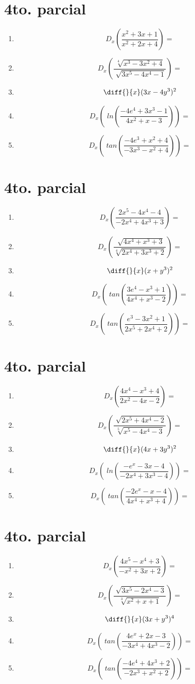 \documentclass[oneside,spanish,letter]{article}
\begin{document}
\section{4to. parcial}
\begin{enumerate}
 \item $$ D_x \left( \frac{x^2+3x+1}{x^2+2x+4}\right)=$$
 \item $$ D_x \left( \frac{\sqrt[4]{x^3-3x^2+4}}{\sqrt[]{3x^5-4x^4-1}}\right)=$$
\item $$\diff{}{x}(3x-4y^3)^2$$
 \item $$ D_x \left(\;ln\left( \frac{-4e^4+3x^3-1}{4x^2+x-3}\right)\right)=$$
 \item $$ D_x \left(\;tan\left( \frac{-4e^3+x^2+4}{-3x^3-x^2+4}\right)\right)=$$
 \end{enumerate}
  \newpage
\section{4to. parcial}
\begin{enumerate}
 \item $$ D_x \left( \frac{2x^5-4x^4-4}{-2x^4+4x^3+3}\right)=$$
 \item $$ D_x \left( \frac{\sqrt[]{4x^4+x^3+3}}{\sqrt[4]{2x^4+3x^3+2}}\right)=$$
\item $$\diff{}{x}(x+y^3)^2$$
 \item $$ D_x \left(\;tan\left( \frac{3e^4-x^3+1}{4x^4+x^3-2}\right)\right)=$$
 \item $$ D_x \left(\;tan\left( \frac{e^3-3x^2+1}{2x^5+2x^4+2}\right)\right)=$$
 \end{enumerate}
  \newpage
\section{4to. parcial}
\begin{enumerate}
 \item $$ D_x \left( \frac{4x^4-x^3+4}{2x^2-4x-2}\right)=$$
 \item $$ D_x \left( \frac{\sqrt[]{2x^5+4x^4-2}}{\sqrt[5]{x^5-4x^4-3}}\right)=$$
\item $$\diff{}{x}(4x+3y^3)^2$$
 \item $$ D_x \left(\;ln\left( \frac{-e^x-3x-4}{-2x^4+3x^3-4}\right)\right)=$$
 \item $$ D_x \left(\;tan\left( \frac{-2e^x-x-4}{4x^4+x^3+4}\right)\right)=$$
 \end{enumerate}
  \newpage
\section{4to. parcial}
\begin{enumerate}
 \item $$ D_x \left( \frac{4x^5-x^4+3}{-x^2+3x+2}\right)=$$
 \item $$ D_x \left( \frac{\sqrt[]{3x^5-2x^4-3}}{\sqrt[3]{x^2+x+1}}\right)=$$
\item $$\diff{}{x}(3x+y^3)^4$$
 \item $$ D_x \left(\;tan\left( \frac{4e^x+2x-3}{-3x^4+4x^3-2}\right)\right)=$$
 \item $$ D_x \left(\;tan\left( \frac{-4e^4+4x^3+2}{-2x^3+x^2+2}\right)\right)=$$
 \end{enumerate}
  \newpage
\end{document}
